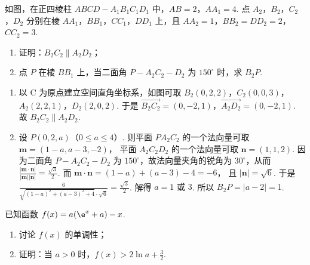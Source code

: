 \begin{problem}
如图，在正四棱柱 \(ABCD-A_1B_1C_1D_1\) 中，\(AB=2\)，\(AA_1=4\). 点 \(A_2\)，\(B_2\)，\(C_2\)，\(D_2\) 分别在棱 \(AA_1\)，\(BB_1\)，\(CC_1\)，\(DD_1\) 上，且 \(AA_2=1\)，\(BB_2=DD_2=2\)，\(CC_2=3\).

\begin{enumerate}
\item 证明：\(B_2C_2\parallel A_2D_2\)；
\item 点 \(P\) 在棱 \(BB_1\) 上，当二面角 \(P-A_2C_2-D_2\) 为 \(150^\circ\) 时，求 \(B_2P\).
\end{enumerate}

\end{problem}

\begin{solution}
\begin{enumerate}
\item 以 C 为原点建立空间直角坐标系，如图可取
\(B_2(0,2,2)\)，\(C_2(0,0,3)\)，\(A_2(2,2,1)\)，\(D_2(2,0,2)\).
于是
\(\overrightarrow{B_2C_2}=(0,-2,1)\)，\(\overrightarrow{A_2D_2}=(0,-2,1)\).
故 \(B_2C_2\parallel A_2D_2\).

\item 设
\(P(0,2,a)\)（\(0\le a\le 4\)）.
则平面 \(PA_2C_2\) 的一个法向量可取
\(\mathbf{m}=(1-a,a-3,-2)\)，
平面 \(A_2C_2D_2\) 的一个法向量可取
\(\mathbf{n}=(1,1,2)\).
因为二面角 \(P-A_2C_2-D_2\) 为 \(150^\circ\)，故法向量夹角的锐角为 \(30^\circ\)，从而
\(\frac{|\mathbf{m}\cdot \mathbf{n}|}{|\mathbf{m}||\mathbf{n}|}=\frac{\sqrt3}{2}\).
而
\(\mathbf{m}\cdot \mathbf{n}=(1-a)+(a-3)-4=-6\)，
且
\(|\mathbf{n}|=\sqrt6\).
于是
\(\frac{6}{\sqrt{(1-a)^2+(a-3)^2+4}\cdot \sqrt6}=\frac{\sqrt3}{2}\).
解得
\(a=1\text{\ 或\ }3\).
所以
\(B_2P=|a-2|=1\).

\end{enumerate}
\end{solution}

\begin{problem}
已知函数 \(f(x)=a(\e^x+a)-x\).
\begin{enumerate}
\item 讨论 \(f(x)\) 的单调性；
\item 证明：当 \(a>0\) 时，\(f(x)>2\ln a+\frac32\).
\end{enumerate}
\end{problem}


